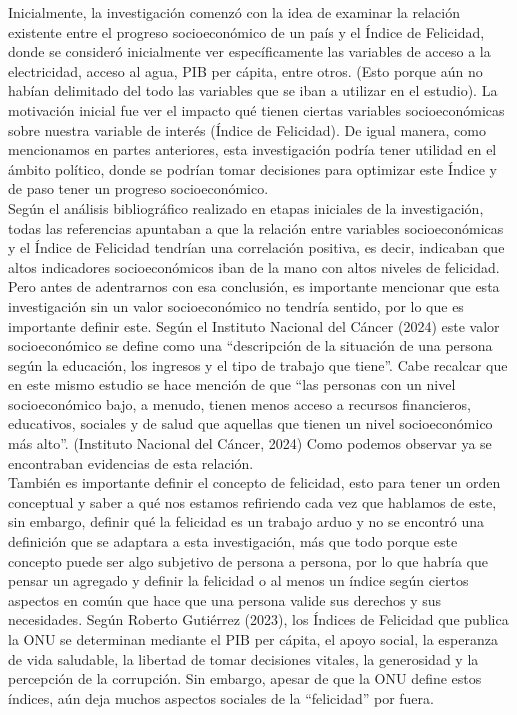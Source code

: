 Inicialmente, la investigación comenzó con la idea de examinar la relación existente entre el progreso socioeconómico de un país y el Índice de Felicidad, donde se consideró inicialmente ver específicamente las variables de acceso a la electricidad, acceso al agua, PIB per cápita, entre otros. (Esto porque aún no habían delimitado del todo las variables que se iban a utilizar en el estudio). La motivación inicial fue ver el impacto qué tienen ciertas variables socioeconómicas sobre nuestra variable de interés (Índice de Felicidad). De igual manera, como mencionamos en partes anteriores, esta investigación podría tener utilidad en el ámbito político, donde se podrían tomar decisiones para optimizar este Índice y de paso tener un progreso socioeconómico.\\

Según el análisis bibliográfico realizado en etapas iniciales de la investigación, todas las referencias apuntaban a que la relación entre variables socioeconómicas y el Índice de Felicidad tendrían una correlación positiva, es decir, indicaban que altos indicadores socioeconómicos iban de la mano con altos niveles de felicidad. Pero antes de adentrarnos con esa conclusión, es importante mencionar que esta investigación sin un valor socioeconómico no tendría sentido, por lo que es importante definir este. Según el Instituto Nacional del Cáncer (2024) este valor socioeconómico se define como una ``descripción de la situación de una persona según la educación, los ingresos y el tipo de trabajo que tiene''. Cabe recalcar que en este mismo estudio se hace mención de que ``las personas con un nivel socioeconómico bajo, a menudo, tienen menos acceso a recursos financieros, educativos, sociales y de salud que aquellas que tienen un nivel socioeconómico más alto''. (Instituto Nacional del Cáncer, 2024) Como podemos observar ya se encontraban evidencias de esta relación. \\

También es importante definir el concepto de felicidad, esto para tener un orden conceptual y saber a qué nos estamos refiriendo cada vez que hablamos de este, sin embargo, definir qué la felicidad es un trabajo arduo y no se encontró una definición que se adaptara a esta investigación, más que todo porque este concepto puede ser algo subjetivo de persona a persona, por lo que habría que pensar un agregado y definir la felicidad o al menos un índice según ciertos aspectos en común que hace que una persona valide sus derechos y sus necesidades. Según Roberto Gutiérrez (2023), los Índices de Felicidad que publica la ONU se determinan mediante el PIB per cápita, el apoyo social, la esperanza de vida saludable, la libertad de tomar decisiones vitales, la generosidad y la percepción de la corrupción. Sin embargo, apesar de que la ONU define estos índices, aún deja muchos aspectos sociales de la ``felicidad'' por fuera. \\


